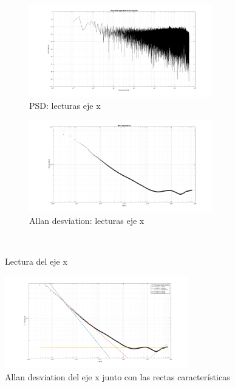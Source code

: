 \documentclass[a4paper,11pt,twoside]{IT-CNEA}
\begin{document}
\begin{figure}[t!]
    \centering
    \begin{subfigure}[t]{0.5\textwidth}
        \centering
        \includegraphics[width=8cm]{Figuras/PSDGyrox.png}
        \caption{PSD: lecturas eje x}
        \label{fig:}
    \end{subfigure}%
    \begin{subfigure}[t]{0.5\textwidth}
        \centering
        \includegraphics[width=8cm]{Figuras/AllanGyrox.png}
        \caption{Allan desviation: lecturas eje x}
        \label{fig:}
    \end{subfigure}%
    ~ 
    \caption{Lectura del eje x}
    \label{fig:lecturasEjex}
\end{figure}
\begin{figure}[h!]
\centering
\includegraphics[width=8cm]{Figuras/AllanGyroxRectas.png}
\caption{Allan desviation del eje x junto con las rectas características}
\label{fig:lecturaEjexRectas}
\end{figure}
\end{document}

